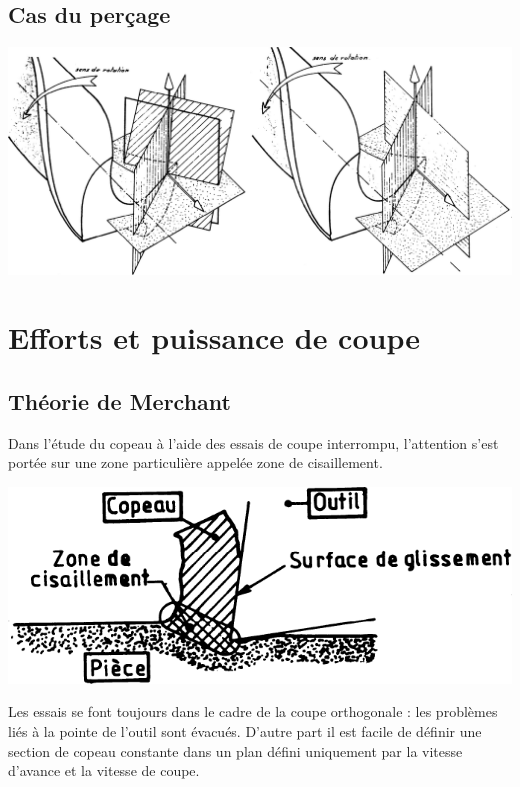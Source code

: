 \documentclass[11pt,oneside]{article}
\begin{document}
\subsection{Cas du perçage}

\begin{center}
\includegraphics[width=.8\textwidth]{png/fig_19}
\end{center}  

     

\section{Efforts et puissance de coupe}

\subsection{Théorie de Merchant}

Dans l'étude du copeau à l’aide des essais de coupe interrompu, l’attention s’est portée sur une zone particulière appelée zone de cisaillement.

\begin{center}
\includegraphics[width=.5\textwidth]{png/fig_20}
\end{center}  


Les essais se font toujours dans le cadre de la coupe orthogonale : les problèmes liés à la pointe de l'outil sont évacués. D'autre part il est facile de définir une section de copeau constante dans un plan défini uniquement par la vitesse d'avance et la vitesse de coupe.
\end{document}

